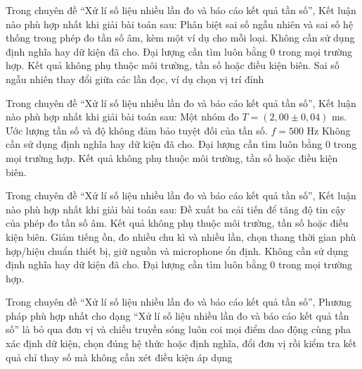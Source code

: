 \begin{ex}
Trong chuyên đề “Xử lí số liệu nhiều lần đo và báo cáo kết quả tần số”, Kết luận nào phù hợp nhất khi giải bài toán sau: Phân biệt sai số ngẫu nhiên và sai số hệ thống trong phép đo tần số âm, kèm một ví dụ cho mỗi loại.
\choice
{Không cần sử dụng định nghĩa hay dữ kiện đã cho.}
{Đại lượng cần tìm luôn bằng 0 trong mọi trường hợp.}
{Kết quả không phụ thuộc môi trường, tần số hoặc điều kiện biên.}
{\True Sai số ngẫu nhiên thay đổi giữa các lần đọc, ví dụ chọn vị trí đỉnh}
\end{ex}

\begin{ex}
Trong chuyên đề “Xử lí số liệu nhiều lần đo và báo cáo kết quả tần số”, Kết luận nào phù hợp nhất khi giải bài toán sau: Một nhóm đo $T=(2,00\pm0,04)$ ms. Ước lượng tần số và độ không đảm bảo tuyệt đối của tần số.
\choice
{\True $f=500$ Hz}
{Không cần sử dụng định nghĩa hay dữ kiện đã cho.}
{Đại lượng cần tìm luôn bằng 0 trong mọi trường hợp.}
{Kết quả không phụ thuộc môi trường, tần số hoặc điều kiện biên.}
\end{ex}

\begin{ex}
Trong chuyên đề “Xử lí số liệu nhiều lần đo và báo cáo kết quả tần số”, Kết luận nào phù hợp nhất khi giải bài toán sau: Đề xuất ba cải tiến để tăng độ tin cậy của phép đo tần số âm.
\choice
{Kết quả không phụ thuộc môi trường, tần số hoặc điều kiện biên.}
{\True Giảm tiếng ồn, đo nhiều chu kì và nhiều lần, chọn thang thời gian phù hợp/hiệu chuẩn thiết bị, giữ nguồn và microphone ổn định.}
{Không cần sử dụng định nghĩa hay dữ kiện đã cho.}
{Đại lượng cần tìm luôn bằng 0 trong mọi trường hợp.}
\end{ex}

\begin{ex}
Trong chuyên đề “Xử lí số liệu nhiều lần đo và báo cáo kết quả tần số”, Phương pháp phù hợp nhất cho dạng “Xử lí số liệu nhiều lần đo và báo cáo kết quả tần số” là
\choice
{bỏ qua đơn vị và chiều truyền sóng}
{luôn coi mọi điểm dao động cùng pha}
{\True xác định dữ kiện, chọn đúng hệ thức hoặc định nghĩa, đổi đơn vị rồi kiểm tra kết quả}
{chỉ thay số mà không cần xét điều kiện áp dụng}
\end{ex}

